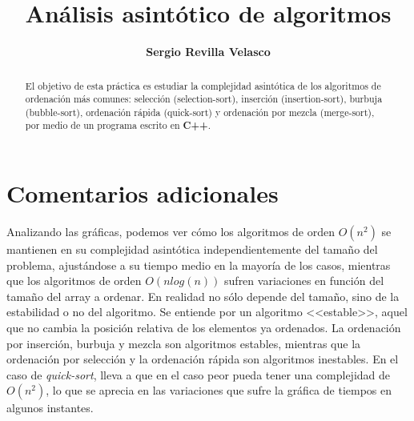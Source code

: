 

\title{\huge{\textbf{Análisis asintótico de algoritmos}}}
\author{\large{\textbf{Sergio Revilla Velasco}}}
\date{}


\maketitle


\begin{abstract}
El objetivo de esta práctica es estudiar la complejidad asintótica de los algoritmos de ordenación más comunes: selección (selection-sort), inserción (insertion-sort), burbuja (bubble-sort), ordenación rápida (quick-sort) y ordenación por mezcla (merge-sort), por medio de un programa escrito en \textbf{C++}.
\end{abstract}


\tableofcontents{}




\section{Comentarios adicionales}
Analizando las gráficas, podemos ver cómo los algoritmos de orden $O(n^2)$ se mantienen en su complejidad asintótica independientemente del tamaño del problema, ajustándose a su tiempo medio en la mayoría de los casos, mientras que los algoritmos de orden $O(nlog(n))$ sufren variaciones en función del tamaño del array a ordenar.  En realidad no sólo depende del tamaño, sino de la estabilidad o no del algoritmo.  Se entiende por un algoritmo <<estable>>, aquel que no cambia la posición relativa de los elementos ya ordenados. La ordenación por inserción, burbuja y mezcla son algoritmos estables, mientras que la ordenación por selección y la ordenación rápida son algoritmos inestables.  En el caso de \textit{quick-sort}, lleva a que en el caso peor pueda tener una complejidad de $O(n^2)$,  lo que se aprecia en las variaciones que sufre la gráfica de tiempos en algunos instantes.




